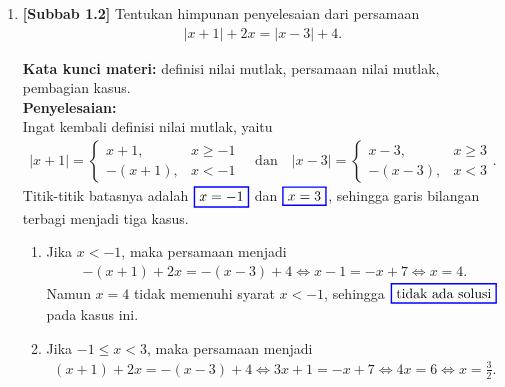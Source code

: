 \documentclass[10pt,openany,a4paper]{article}
\theoremstyle{definition}
\theoremstyle{definition}
\theoremstyle{plain}
\newenvironment{jawab}[2][tes]{%
\par\noindent\textbf{Kata kunci materi:} #1.\\
\textbf{Penyelesaian:} #2%
}{}
\begin{document}
\newpage

\begin{enumerate}
    \item \textbf{[Subbab 1.2]} Tentukan himpunan penyelesaian dari persamaan
    \begin{align*}
        |x+1|+2x=|x-3|+4.
    \end{align*}
    \begin{jawab}[definisi nilai mutlak, persamaan nilai mutlak, pembagian kasus]{~\\
        Ingat kembali definisi nilai mutlak, yaitu
        \begin{align*}
            |x+1| = \begin{cases}
                x+1, & x\geq -1\\
                -(x+1), & x<-1
            \end{cases}
            \quad\text{dan}\quad
            |x-3| = \begin{cases}
                x-3, & x\geq 3\\
                -(x-3), & x<3
            \end{cases}.
        \end{align*}
        Titik-titik batasnya adalah $\colorlet{oldcolor}{.}
        \color{blue}
        \setlength{\fboxrule}{1pt} \boxed{\color{oldcolor}x=-1}\color{oldcolor}$ dan $\colorlet{oldcolor}{.}
        \color{blue}
        \setlength{\fboxrule}{1pt} \boxed{\color{oldcolor}x=3}\color{oldcolor}$, sehingga garis bilangan terbagi menjadi tiga kasus.
        \begin{enumerate}
            \item[(i)] Jika $x<-1$, maka persamaan menjadi
            \begin{align*}
                -(x+1)+2x = -(x-3)+4 \iff x-1 = -x+7 \iff x=4.
            \end{align*}
            Namun $x=4$ tidak memenuhi syarat $x<-1$, sehingga $\colorlet{oldcolor}{.}
        \color{blue}
        \setlength{\fboxrule}{1pt} \boxed{\color{oldcolor}\text{tidak ada solusi}}\color{oldcolor}$ pada kasus ini.
            \item[(ii)] Jika $-1\leq x<3$, maka persamaan menjadi
            \begin{align*}
                (x+1)+2x = -(x-3)+4 \iff 3x+1 = -x+7 \iff 4x=6 \iff x=\frac{3}{2}.

\end{align*}
\end{enumerate}}
\end{jawab}
\end{enumerate}
\end{document}

